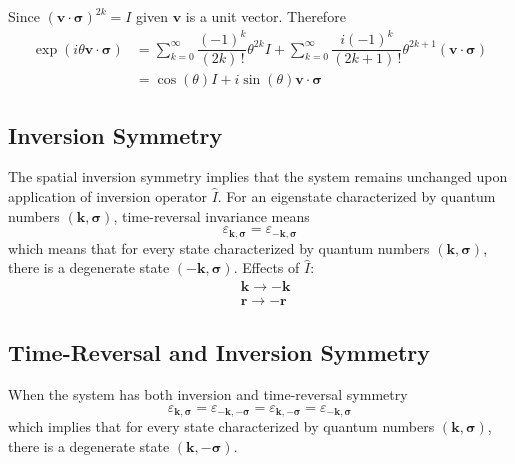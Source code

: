 \documentclass[aps,prb,onecolumn,notitlepage,showpacs,floatfix,superscriptaddress]{revtex4-1}
\begin{document}
Since $\left(  {\bm v}\cdot{\bm \sigma}\right)^{2k}=I$ given ${\bm v}$ is a unit vector. Therefore
\begin{equation}
\begin{split}
\exp\left( i \theta {\bm v}\cdot{\bm \sigma}\right) &=\sum_{k=0}^{\infty} \dfrac{(-1)^k}{(2k)\, !} \theta^{2k} I +\sum_{k=0}^{\infty} \dfrac{i(-1)^k}{(2k+1)\, !} \theta^{2k+1} \left(  {\bm v}\cdot{\bm \sigma}\right) \\
&= \cos(\theta)I + i \sin(\theta) {\bm v}\cdot{\bm \sigma}
\end{split}
\end{equation}
\subsection{Inversion Symmetry}
The spatial inversion symmetry implies that the system remains unchanged upon application of inversion operator $\hat{I}$. For an eigenstate characterized by quantum numbers $({\bm k},{\bm \sigma})$, time-reversal invariance means
\begin{equation}
\varepsilon_{{\bm k},{\bm \sigma}}=\varepsilon_{-{\bm k},{\bm \sigma}}
\end{equation}
which means that for every state characterized by quantum numbers $({\bm k},{\bm \sigma})$, there is a degenerate state $(-{\bm k},{\bm \sigma})$. Effects of $\hat{I}$:
\begin{equation}
\begin{split}
&{\bm k} \rightarrow -{\bm k} \\
&{\bm r} \rightarrow -{\bm r}
\end{split}
\end{equation}

\subsection{Time-Reversal and Inversion Symmetry}
When the system has both inversion and time-reversal symmetry
\begin{equation}
\varepsilon_{{\bm k},{\bm \sigma}}=\varepsilon_{-{\bm k},-{\bm \sigma}}=\varepsilon_{{\bm k},-{\bm \sigma}}=\varepsilon_{-{\bm k},{\bm \sigma}}
\end{equation}
which implies that for every state characterized by quantum numbers $({\bm k},{\bm \sigma})$, there is a degenerate state $({\bm k},-{\bm \sigma})$. 
\end{document}
